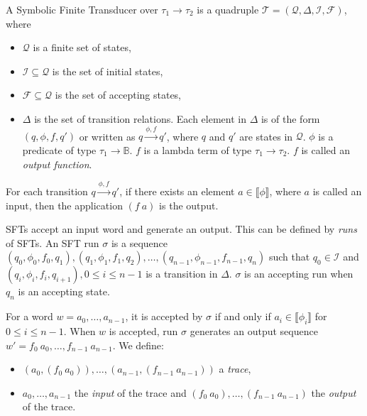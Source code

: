 \documentclass[a4paper,UKenglish,cleveref, autoref, anonymous, thm-restate]{lipics-v2021}
\begin{document}
\begin{definition}
\label{def-sft}
   A Symbolic Finite Transducer over $\tau_1\rightarrow \tau_2$ is a quadruple $\mathcal{T} = (\mathcal{Q}, \Delta, \mathcal{I}, \mathcal{F})$, where 
   \begin{itemize}
   \item $\mathcal{Q}$ is a finite set of states,
   \item $\mathcal{I}\subseteq \mathcal{Q}$ is the set of initial states,
   \item $\mathcal{F} \subseteq\mathcal{Q}$ is the set of accepting states,
   \item $\Delta$ is the set of transition relations. Each element in $\Delta$ is of the form $(q, \phi, f, q')$ or written as $q\xrightarrow{\phi, f} q'$, where $q$ and $q'$ are states in $\mathcal{Q}$.
   $\phi$ is a predicate of type $\tau_1\rightarrow \mathbb{B}$.
   $f$ is a lambda term of type $\tau_1\rightarrow \tau_2$. $f$ is called an \emph{output function}.
   \end{itemize}

For each transition $q\xrightarrow{\phi, f} q'$, if there exists an element $a\in \llbracket \phi \rrbracket$, where $a$ is called an input,  then the application $(f~a)$ is the output.
   
\end{definition}

SFTs accept an input word and generate an output. This can be defined by \emph{runs} of SFTs.
An SFT run $\sigma$ is a sequence $(q_0, \phi_0, f_0, q_1),(q_1, \phi_1, f_1, q_2),\ldots, (q_{n-1}, \phi_{n-1}, f_{n-1}, q_n)$ such that $q_0\in \mathcal{I}$ and $(q_i, 
\phi_i, f_i, q_{i+1}), 0 \leq i \leq n-1$ is a transition in $\Delta$.
$\sigma$ is an accepting run when $q_n$ is an accepting state.

For a word $w = a_0,\ldots, a_{n-1}$, it is accepted by $\sigma$ if and only if $a_i \in \llbracket\phi_i \rrbracket$ for $0 \leq i \leq n - 1$. When $w$ is accepted, run $\sigma$ generates an output sequence $w'= f_0~a_0, \ldots, f_{n-1}~a_{n-1}$. We define:
\begin{itemize}
\item  $(a_0,(f_0~a_0)), \ldots, (a_{n-1},(f_{n-1}~a_{n-1}))$ a \emph{trace},
\item $a_0,\ldots,a_{n-1}$ the \emph{input} of the trace and $(f_0~a_0), \ldots, (f_{n-1}~a_{n-1})$ the \emph{output} of the trace.
\end{itemize}
\end{document}
